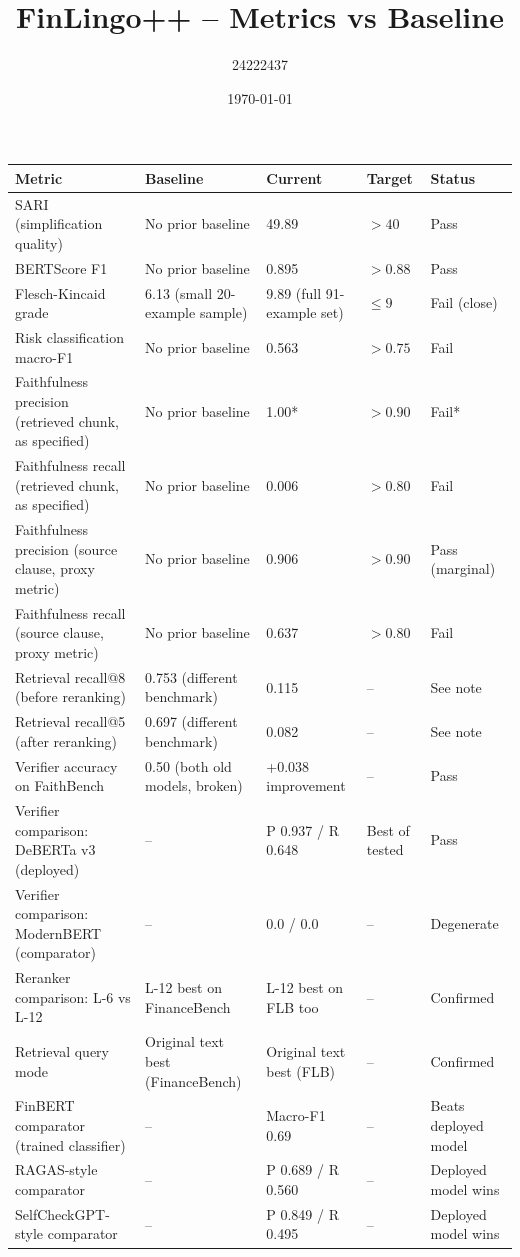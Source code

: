 \documentclass[11pt]{article}
\title{FinLingo++ -- Metrics vs Baseline}
\author{24222437}
\date{\today}
\begin{document}
\maketitle

\begin{longtable}{p{4.3cm} p{2.6cm} p{2.3cm} p{2.1cm} p{3.6cm}}
\toprule
\textbf{Metric} & \textbf{Baseline} & \textbf{Current} & \textbf{Target} & \textbf{Status} \\
\midrule
\endhead

SARI (simplification quality) & No prior baseline & 49.89 & $>40$ & Pass \\
BERTScore F1 & No prior baseline & 0.895 & $>0.88$ & Pass \\
Flesch-Kincaid grade & 6.13 (small 20-example sample) & 9.89 (full 91-example set) & $\leq 9$ & Fail (close) \\
\addlinespace
Risk classification macro-F1 & No prior baseline & 0.563 & $>0.75$ & Fail \\
\addlinespace
Faithfulness precision (retrieved chunk, as specified) & No prior baseline & 1.00* & $>0.90$ & Fail* \\
Faithfulness recall (retrieved chunk, as specified) & No prior baseline & 0.006 & $>0.80$ & Fail \\
Faithfulness precision (source clause, proxy metric) & No prior baseline & 0.906 & $>0.90$ & Pass (marginal) \\
Faithfulness recall (source clause, proxy metric) & No prior baseline & 0.637 & $>0.80$ & Fail \\
\addlinespace
Retrieval recall@8 (before reranking) & 0.753 (different benchmark) & 0.115 & -- & See note \\
Retrieval recall@5 (after reranking) & 0.697 (different benchmark) & 0.082 & -- & See note \\
\addlinespace
Verifier accuracy on FaithBench & 0.50 (both old models, broken) & +0.038 improvement & -- & Pass \\
\addlinespace
Verifier comparison: DeBERTa v3 (deployed) & -- & P 0.937 / R 0.648 & Best of tested & Pass \\
Verifier comparison: ModernBERT (comparator) & -- & 0.0 / 0.0 & -- & Degenerate \\
\addlinespace
Reranker comparison: L-6 vs L-12 & L-12 best on FinanceBench & L-12 best on FLB too & -- & Confirmed \\
Retrieval query mode & Original text best (FinanceBench) & Original text best (FLB) & -- & Confirmed \\
\addlinespace
FinBERT comparator (trained classifier) & -- & Macro-F1 0.69 & -- & Beats deployed model \\
RAGAS-style comparator & -- & P 0.689 / R 0.560 & -- & Deployed model wins \\
SelfCheckGPT-style comparator & -- & P 0.849 / R 0.495 & -- & Deployed model wins \\
\bottomrule
\end{longtable}
\end{document}
